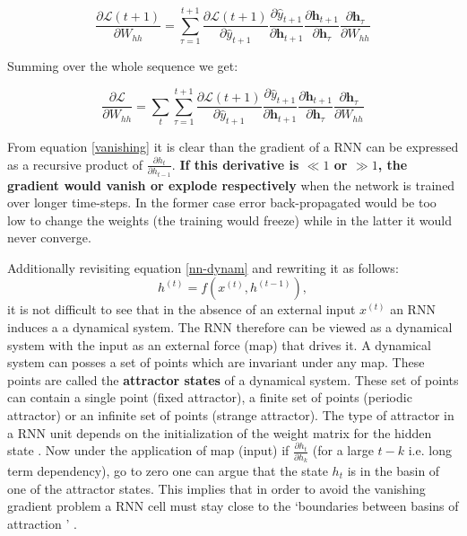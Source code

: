 \begin{equation}
\frac{\partial \mathbf{\mathcal{L}}\left(t+1\right)}{\partial W_{hh}} = \sum_{\tau=1}^{t+1}\frac{\partial \mathbf{\mathcal{L}}\left(t+1\right)}{\partial \hat{y}_{t+1}} \frac{\partial  \hat{y}_{t+1}}{\partial \mathbf{h}_{t+1}} \frac{\partial \mathbf{h}_{t+1}}{\partial \mathbf{h}_{\tau}} \frac{\partial \mathbf{h}_{\tau}}{\partial W_{hh}}
\end{equation}

Summing over the whole sequence we get:

\begin{equation} \label{vanishing}
\frac{\partial \mathbf{\mathcal{L}}}{\partial W_{hh}} = \sum_{t}\sum_{\tau=1}^{t+1}\frac{\partial \mathbf{\mathcal{L}}\left(t+1\right)}{\partial \hat{y}_{t+1}} \frac{\partial  \hat{y}_{t+1}}{\partial \mathbf{h}_{t+1}} \frac{\partial \mathbf{h}_{t+1}}{\partial \mathbf{h}_{\tau}} \frac{\partial \mathbf{h}_{\tau}}{\partial W_{hh}}
\end{equation}

From equation \ref{vanishing} it is clear than the gradient of a RNN can be expressed as a recursive product of $\frac{\partial h_t}{\partial h_{t-1}}$. \textbf{If this derivative is $\ll 1$ or $\gg 1$, the gradient would vanish or explode respectively} when the network is trained over longer time-steps. In the former case error back-propagated would be too low to change the weights (the training would freeze) while in the latter it would never converge. 

Additionally revisiting equation \ref{nn-dynam} and rewriting it as follows:
\begin{equation}\label{ndq}	
h^{(t)} = f(x^{(t)}, h^{(t-1)}),
\end{equation}
it is not difficult to see that in the absence of an external input $x^{(t)}$ an RNN induces a a dynamical system. The RNN therefore can be viewed as a dynamical system with the input as an external force (map) that drives it. A dynamical system can posses a set of points which are invariant under any map. These points are called the \textbf{attractor states} of a dynamical system. These set of points can contain a single point (fixed attractor), a finite set of points (periodic attractor) or an infinite set of points (strange attractor). The type of attractor in a RNN unit depends on the initialization of the weight matrix for the hidden state \citep{Bengio1993}. Now under the application of map (input) if $\frac{\partial h_t}{\partial h_{k}}$ (for a large $t - k$ i.e. long term dependency), go to zero one can argue that the state $h_t$ is in the basin of one of the attractor states. This implies that in order to avoid the vanishing gradient problem a RNN cell must stay close to the \lq boundaries between basins of attraction \rq{} \citep{Pascanu2012}.

